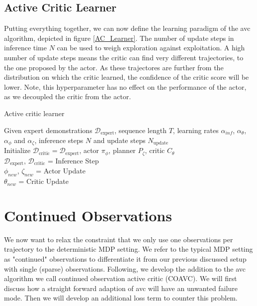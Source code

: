 \subsection{Active Critic Learner}
Putting everything together, we can now define the learning paradigm of the \ac{avc} algorithm, depicted in figure \ref{AC_Learner}. The number of update 
steps in inference time $N$ can be used to weigh exploration against exploitation. A high number of update steps means the critic can find very different 
trajectories, to the one proposed by the actor. As these trajectores are further from the distribution on which the critic learned, the confidence of the 
critic score will be lower. Note, this hyperparameter has no effect on the performance of the actor, as we decoupled the critic from the actor.
\begin{algorithm}
    \caption{Active critic learner}
    \label{AC_Learner}
    \begin{algorithmic}
    \Require Given expert demonstrations $\mathcal{D}_{\text{expert}}$, sequence length $T$, learning rates $\alpha_{inf}$, $\alpha_{\theta}$, 
    $\alpha_{\phi}$ and $\alpha_{\zeta}$, inference steps $N$ and update steps $N_{\text{update}}$\\
    \State Initialize  $\mathcal{D}_{\text{critic}} = \mathcal{D}_{\text{expert}}$, 
    actor $\pi_{\phi}$, planner $P_{\zeta}$, critic $C_{\theta}$\\
    {
        {
           $\mathcal{D}_{\text{expert}}$, $\mathcal{D}_{\text{critic}}$ = Inference Step \hfill{}\\
        }
        {
            $\phi_{new}$, $\zeta_{new}$ = Actor Update \hfill{}\\
            $\theta_{new}$ = Critic Update \hfill{}\\
        }
    }
    \end{algorithmic}
\end{algorithm}

\section{Continued Observations}
\label{sec:relax_dense}
We now want to relax the constraint that we only use one observations per trajectory to the deterministic MDP setting. 
We refer to the typical MDP setting as "continued" observations to differentiate it from our previous discussed setup with single (sparse) observations. 
Following, we develop the addition to the \ac{avc} algorithm we call continued observation active critic (COAVC). 
We will first discuss how a straight forward adaption of \ac{avc} will have an unwanted failure mode. Then we will develop an additional loss term to counter this problem.\\

